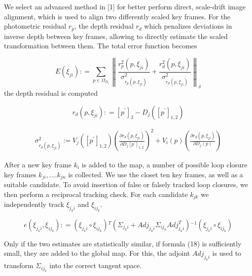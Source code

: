 We select an advanced method in [1] for better perform direct, scale-drift image alignment, which is used to align two differently scaled key frames. For the photometric residual ${r_p}$, the depth residual ${r_d}$ which penalizes deviations in inverse depth between key frames, allowing to directly estimate the scaled transformation between them. The total error function becomes

\begin{equation}
E({\xi _{ji}}): = {\sum\limits_{p \in {\Omega _{{D_i}}}} {\left\| {\frac{{r_p^2(p,{\xi _{ji}})}}{{\sigma _{{r_p}(p,{\xi _{ji}})}^2}} + \frac{{r_d^2(p,{\xi _{ji}})}}{{\sigma _{{r_d}(p,{\xi _{ji}})}^2}}} \right\|} _\delta }
\end{equation}
the depth residual is computed

\begin{equation}
r_{d}(p,\xi _{ji}): = [p^{'}]_{3} - D_{j}([p^{'}]_{1,2})
\end{equation}

\begin{equation}
\begin{split}
\sigma_{r_{d}(p,\xi_{ji})} ^{2} :=V_{j}( [ p^{'} ]_{1,2} )  {\left( \frac {\partial r_{d}(p,\xi_{ji})} {\partial D_{j} \left[ p^{'} \right]_{1,2}}  \right)^{2}} + V_{i}(p) \left( \frac {\partial r_{d}(p,\xi_{ji})} {\partial D_{j}(p)} \right)
\end{split}
\end{equation}

After a new key frame ${k_i}$ is added to the map, a number of possible loop closure key frames ${k_{ji}},....{k_{jn}}$ is collected. We use the closet ten key frames, as well as a suitable candidate. To avoid insertion of false or falsely tracked loop closures, we then perform a reciprocal tracking check. For each candidate ${k_{jk}}$ we independently track ${\xi _{{j_k}i}}$ and ${\xi _{i{j_k}}}$.

\begin{equation}
e\!(\!{\xi _{{j_k}i}},{\xi _{i{j_k}}})\!: \!= \!{\!(\!{\xi _{{j_k}i}} \!\circ \!{\xi _{i{j_k}}})\!^T}{\!(\!{\Sigma _{{j_k}i}}\! +\! Ad{j_{{j_k}i}}{\Sigma _{i{j_k}}}Adj_{{j_k}i}^T\!)\!^{ - 1}}\!(\!{\xi _{{j_k}i}}\! \circ\! {\xi _{i{j_k}}}\!)
\end{equation}

Only if the two estimates are statistically similar, if formula (18) is sufficiently small, they are added to the global map. For this, the adjoint $Ad{j_{{j_k}i}}$ is used to transform ${\Sigma _{i{j_k}}}$ into the correct tangent space.

